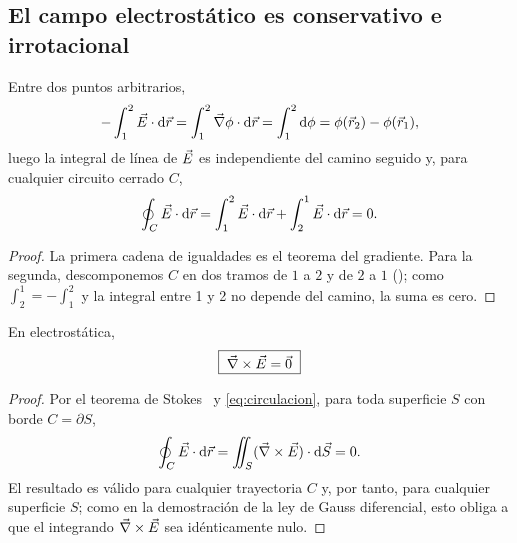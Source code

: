 \subsection{El campo electrostático es conservativo e irrotacional}\label{sec:rotacional}
\begin{teorema}\label{teo:conservativo}
Entre dos puntos arbitrarios,
\begin{equation}\label{eq:int-linea}
  -\int_{1}^{2}\vec{E}\cdot\mathrm{d}\vec{r}=\int_{1}^{2}\vec{\nabla}\phi\cdot\mathrm{d}\vec{r}=\int_{1}^{2}\mathrm{d}\phi=\phi(\vec{r}_2)-\phi(\vec{r}_1),
\end{equation}
luego la integral de línea de $\vec{E}$ es independiente del camino seguido y, para cualquier circuito cerrado $C$,
\begin{equation}\label{eq:circulacion}
  \oint_{C}\vec{E}\cdot\mathrm{d}\vec{r}=\int_{1}^{2}\vec{E}\cdot\mathrm{d}\vec{r}+\int_{2}^{1}\vec{E}\cdot\mathrm{d}\vec{r}=0 .
\end{equation}
\end{teorema}
\begin{proof}
La primera cadena de igualdades es el teorema del gradiente. Para la segunda, descomponemos $C$ en dos tramos de $1$ a $2$ y de $2$ a $1$
(); como $\int_{2}^{1}=-\int_{1}^{2}$ y la integral entre 1 y 2 no depende del camino, la suma es cero.
\end{proof}

\begin{teorema}\label{teo:irrotacional}
En electrostática,
\begin{equation}\label{eq:rotacional}
  \boxed{\;\vec{\nabla}\times\vec{E}=\vec{0}\;}
\end{equation}
\end{teorema}
\begin{proof}
Por el teorema de Stokes~\cite{TEMA0} y \cref{eq:circulacion}, para toda superficie $S$ con borde $C=\partial S$,
\[
  \oint_{C}\vec{E}\cdot\mathrm{d}\vec{r}=\iint_{S}(\vec{\nabla}\times\vec{E})\cdot\mathrm{d}\vec{S}=0 .
\]
El resultado es válido para cualquier trayectoria $C$ y, por tanto, para cualquier superficie $S$; como en la demostración de la ley
de Gauss diferencial, esto obliga a que el integrando $\vec{\nabla}\times\vec{E}$ sea idénticamente nulo.
\end{proof}

